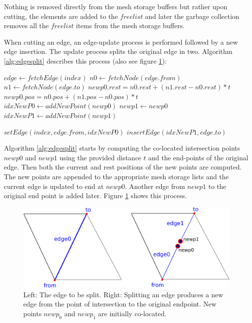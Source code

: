 Nothing is removed directly from the mesh storage buffers but rather upon cutting, the elements
are added to the $freelist$ and later the garbage collection removes all the $freelist$ items from the mesh storage buffers. 

When cutting an edge, an edge-update process is performed followed by a new edge insertion. 
The update process splits the original edge in two. Algorithm \ref{alg:edgesplit} describes this process (also see figure \ref{fig:splitedge}):

\begin{algorithm}[H]
\caption{Splitting an edge in our volumetric mesh data structure. The input to this algorithm is the index of the edge to be splitted
and the distance $t$ along the edge where the intersection happens. Figure \ref{fig:splitedge} shows this operation in detail. }
\label{alg:edgesplit}
\begin{algorithmic}[1]	
  \STATE $edge \gets fetchEdge(index)$
  \STATE $n0 \gets fetchNode(edge.from)$
  \STATE $n1 \gets fetchNode(edge.to)$
  \STATE $newp0.rest = n0.rest + (n1.rest - n0.rest) * t$
  \STATE $newp0.pos = n0.pos + (n1.pos - n0.pos) * t$
  \STATE $idxNewP0 \gets addNewPoint(newp0)$
  \STATE $newp1 \gets newp0$
  \STATE $idxNewP1 \gets addNewPoint(newp1)$
  
  \STATE $setEdge(index, edge.from, idxNewP0)$
  \STATE $insertEdge(idxNewP1, edge.to)$

\end{algorithmic}
\end{algorithm}

Algorithm \ref{alg:edgesplit} starts by computing the co-located intersection points $newp0$ and $newp1$ using the provided distance $t$
and the end-points of the original edge. Then both the current and rest positions of the new points are computed. The new points are appended to the 
appropriate mesh storage lists and the current edge is updated to end at $newp0$. Another edge from $newp1$ to the original end point is added later.
Figure \ref{fig:splitedge} shows this process.


\begin{figure}[H]
  \centering
  \includegraphics[width=0.8\linewidth]{figures/cutting/splitedge.pdf}
  \caption{\label{fig:splitedge}
  {Left: The edge to be split. Right: Splitting an edge produces a new edge from the point of 
  intersection to the original endpoint. New points $newp_0$ and $newp_1$ are initially co-located.}
}
\end{figure}


